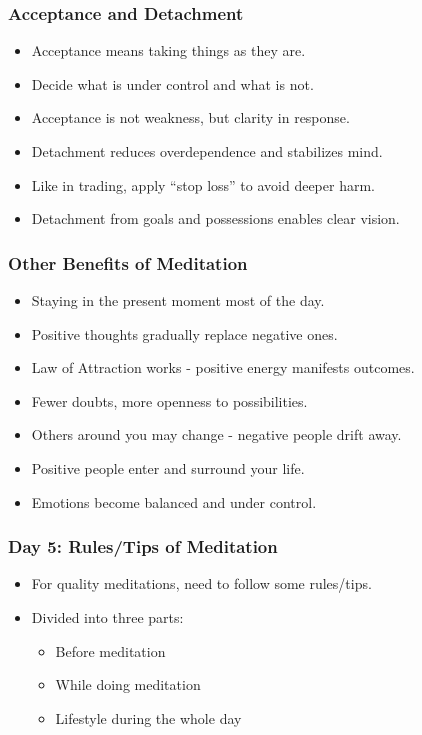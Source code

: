 \begin{frame}[fragile]\frametitle{Acceptance and Detachment}
      \begin{itemize}
        \item Acceptance means taking things as they are.
        \item Decide what is under control and what is not.
        \item Acceptance is not weakness, but clarity in response.
        \item Detachment reduces overdependence and stabilizes mind.
        \item Like in trading, apply “stop loss” to avoid deeper harm.
        \item Detachment from goals and possessions enables clear vision.
      \end{itemize}
\end{frame}

\begin{frame}[fragile]\frametitle{Other Benefits of Meditation}
      \begin{itemize}
        \item Staying in the present moment most of the day.
        \item Positive thoughts gradually replace negative ones.
        \item Law of Attraction works - positive energy manifests outcomes.
        \item Fewer doubts, more openness to possibilities.
        \item Others around you may change - negative people drift away.
        \item Positive people enter and surround your life.
        \item Emotions become balanced and under control.
      \end{itemize}
\end{frame}

\begin{frame}[fragile]\frametitle{Day 5: Rules/Tips of Meditation}
\begin{itemize}
  \item For quality meditations, need to follow some rules/tips.
  \item Divided into three parts:
    \begin{itemize}
      \item Before meditation
      \item While doing meditation
      \item Lifestyle during the whole day
    \end{itemize}
\end{itemize}
\end{frame}

